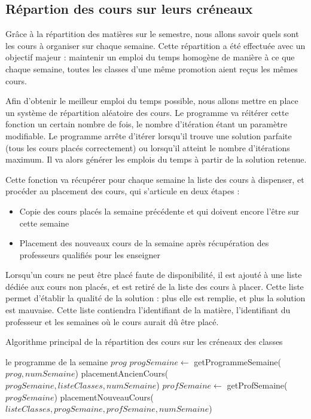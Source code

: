 \subsection{Répartion des cours sur leurs créneaux}

Grâce à la répartition des matières sur le semestre, nous allons savoir quels sont les cours à organiser sur chaque semaine. Cette répartition a été effectuée avec un objectif majeur : maintenir un emploi du temps homogène de manière à ce que chaque semaine, toutes les classes d'une même promotion aient reçus les mêmes cours.

Afin d'obtenir le meilleur emploi du temps possible, nous allons mettre en place un système de répartition aléatoire des cours. Le programme va réitérer cette fonction un certain nombre de fois, le nombre d'itération étant un paramètre modifiable. Le programme arrête d'itérer lorsqu'il trouve une solution parfaite (tous les cours placés correctement) ou lorsqu'il atteint le nombre d'itérations maximum. Il va alors générer les emplois du temps à partir de la solution retenue.

Cette fonction va récupérer pour chaque semaine la liste des cours à dispenser, et procéder au placement des cours, qui s'articule en deux étapes :\\

\begin{itemize}
\item Copie des cours placés la semaine précédente et qui doivent encore l'être sur cette semaine
\item Placement des nouveaux cours de la semaine après récupération des professeurs qualifiés pour les enseigner
\end{itemize}

Lorsqu'un cours ne peut être placé faute de disponibilité, il est ajouté à une liste dédiée aux cours non placés, et est retiré de la liste des cours à placer. Cette liste permet d'établir la qualité de la solution : plus elle est remplie, et plus la solution est mauvaise. Cette liste contiendra l'identifiant de la matière, l'identifiant du professeur et les semaines où le cours aurait dû être placé.

\begin{algorithm}
\caption {Algorithme principal de la répartition des cours sur les créneaux des classes}
\begin{algorithmic}
\REQUIRE le programme de la semaine $prog$
\STATE $progSemaine \leftarrow$ getProgrammeSemaine($prog, numSemaine$)
\STATE placementAncienCours($progSemaine, listeClasses, numSemaine$)
\STATE $profSemaine \leftarrow$ getProfSemaine($progSemaine$)
\STATE placementNouveauCours($listeClasses, progSemaine, profSemaine, numSemaine$)
\ENDIF
{}
\ENDIF
\ENDFOR
{}
\end{algorithmic}
\end{algorithm}

